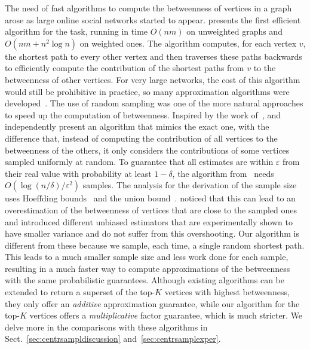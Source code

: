 The need of fast algorithms to compute the betweenness of vertices in a graph
arose as large online social networks started to appear. \citet{Brandes01} presents the
first efficient algorithm for the task, running in time $O(nm)$ on
unweighted graphs and $O(nm+n^2\log n)$ on weighted ones. The
algorithm computes, for each vertex $v$, the shortest path to every other vertex
and then traverses these paths backwards to efficiently compute the contribution
of the shortest paths from $v$ to the betweenness of other vertices. For very
large networks, the cost of this algorithm would still be prohibitive in
practice, so many approximation algorithms were
developed~\citep{JacobKLPT05,BrandesP07,BaderKMM07,GeisbergerSS08,MaiyaBW10,LimMRTB11}.
The use of random sampling was one of the more natural approaches to speed up
the computation of betweenness. Inspired by the work of~\citet{EppsteinW04},
\citet{JacobKLPT05} and independently \citet{BrandesP07} present an algorithm
that mimics the exact one, with the difference that,
instead of computing the contribution of all vertices to the betweenness of the
others, it only considers the contributions of some vertices sampled uniformly
at random. To guarantee that all estimates are within $\varepsilon$ from their
real value with probability at least $1-\delta$, the algorithm
from~\citep{JacobKLPT05,BrandesP07} needs $O(\log(n/\delta)/\varepsilon^2)$
samples. The analysis for the derivation of the sample size uses Hoeffding bounds~\citep{Hoeffding63} 
and the union bound~\citep{MitzenmacherU05}. 
\citet{GeisbergerSS08} noticed that this can lead
to an overestimation of the betweenness of vertices that are close to the
sampled ones and introduced different unbiased estimators that are
experimentally shown to have smaller variance and do not suffer from this
overshooting. Our algorithm is different from these because we sample, each
time, a single random shortest path. %
This leads to a much smaller sample size and less work done for each sample,
resulting in a much faster way to compute approximations of the betweenness with
the same probabilistic guarantees. 
\ifproof
Although existing algorithms \citep{BrandesP07,JacobKLPT05,GeisbergerSS08} can be extended to return a
superset of the top-$K$ vertices with highest betweenness, they only offer an
\emph{additive} approximation guarantee, while our algorithm for the top-$K$
vertices offers a \emph{multiplicative} factor guarantee, which is much
stricter. 
\fi
We delve more in the comparisons with these algorithms in
Sect.~\ref{sec:centrsampldiscussion} and~\ref{sec:centrsamplexper}. 

